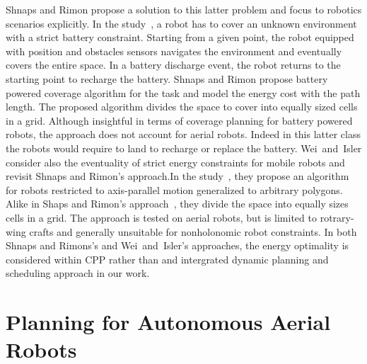 Shnaps and Rimon propose a solution to this latter problem and focus to robotics scenarios explicitly. In the study~\citep{shnaps2016online}, a robot has to cover an unknown environment with a strict battery constraint. Starting from a given point, the robot equipped with position and obstacles sensors navigates the environment and eventually covers the entire space. In a battery discharge event, the robot returns to the starting point to recharge the battery. Shnaps and Rimon propose battery powered coverage algorithm for the task and model the energy cost with the path length. The proposed algorithm divides the space to cover into equally sized cells in a grid. Although insightful in terms of coverage planning for battery powered robots, the approach does not account for aerial robots. Indeed in this latter class the robots would require to land to recharge or replace the battery. Wei~and~Isler consider also the eventuality of strict energy constraints for mobile robots and revisit Shnaps and Rimon's approach.In the study~\citep{wei2018coverage}, they propose an algorithm for robots restricted to axis-parallel motion generalized to arbitrary polygons. Alike in Shaps and Rimon's approach~\citep{shnaps2016online}, they divide the space into equally sizes cells in a grid. The approach is tested on aerial robots, but is limited to rotrary-wing crafts and generally unsuitable for nonholonomic robot constraints. In both Shnaps and Rimons's and Wei~and~Isler's approaches, the energy optimality is considered within CPP rather than and intergrated dynamic planning and scheduling approach in our work.

\section{Planning for Autonomous Aerial Robots}
\label{sec:soa-aerial-pl}

